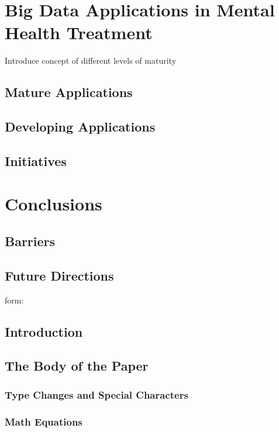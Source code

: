 \documentclass[sigconf]{acmart}
\begin{document}
\section{Big Data Applications in Mental Health Treatment}

Introduce concept of different levels of maturity

\subsection{Mature Applications}



\subsection{Developing Applications}



\subsection{Initiatives}



\section{Conclusions}

\subsection{Barriers}

\subsection{Future Directions}


\appendix

form:

\subsection{Introduction}
\subsection{The Body of the Paper}
\subsubsection{Type Changes and  Special Characters}
\subsubsection{Math Equations}
\end{document}
